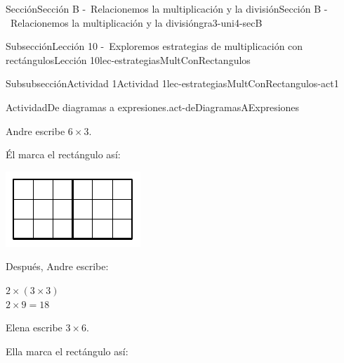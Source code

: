 \documentclass[twoside,10pt,]{article}
\begin{document}
\begin{sectionptx}{Sección}{Sección B -~Relacionemos la multiplicación y la división}{}{Sección B -~Relacionemos la multiplicación y la división}{}{}{gra3-uni4-secB}
\begin{subsectionptx}{Subsección}{Lección 10 -~Exploremos estrategias de multiplicación con rectángulos}{}{Lección 10}{}{}{lec-estrategiasMultConRectangulos}
\begin{subsubsectionptx}{Subsubsección}{Actividad 1}{}{Actividad 1}{}{}{lec-estrategiasMultConRectangulos-act1}
\begin{activity}{Actividad}{De diagramas a expresiones.}{act-deDiagramasAExpresiones}
\begin{sidebyside}{2}{0.025}{0.025}{0.05}
\end{sidebyside}%
\begin{sidebyside}{3}{0}{0}{0.065}%
\begin{sbspanel}{0.27}%
Andre escribe \(6\times 3\).%
\end{sbspanel}%
\begin{sbspanel}{0.35}%
Él marca el rectángulo así:%
\par
\includegraphics[width=\linewidth]{external/svg-source/tikz-file-153044.pdf}
\end{sbspanel}%
\begin{sbspanel}{0.25}%
Después, Andre escribe:%
\par
\(2 \times (3 \times 3)\)\\
 \(2 \times 9 = 18\)%
\end{sbspanel}%
\end{sidebyside}%
\begin{sidebyside}{3}{0}{0}{0.065}%
\begin{sbspanel}{0.27}%
Elena escribe \(3\times 6\).%
\end{sbspanel}%
\begin{sbspanel}{0.35}%
Ella marca el rectángulo así:%
\par

\end{sbspanel}
\end{sidebyside}
\end{activity}
\end{subsubsectionptx}
\end{subsectionptx}
\end{sectionptx}
\end{document}
